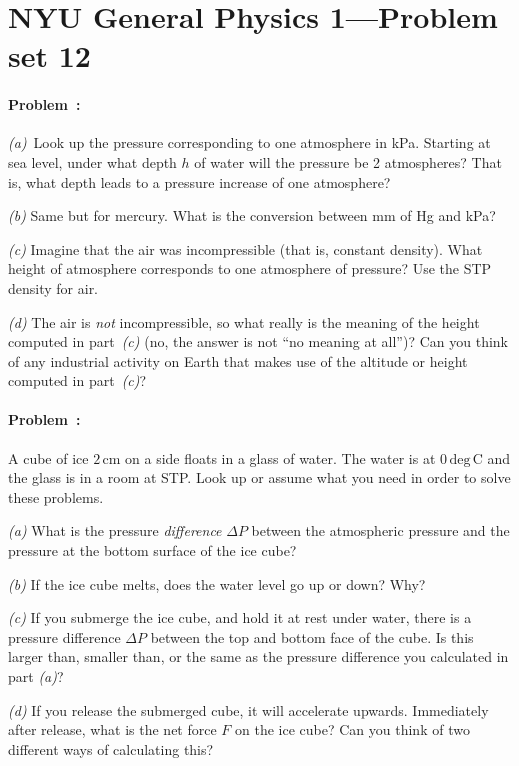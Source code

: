 \documentclass[12pt]{article}
\newcommand{\cm}{\mathrm{cm}}
\newcommand{\C}{\mathrm{deg\,C}}
\newcounter{problem}
\begin{document}
\thispagestyle{empty}

\section*{NYU General Physics 1---Problem set 12}

\paragraph{Problem~\theproblem:}%
\textsl{(a)}~Look up the pressure corresponding to one atmosphere in
kPa.  Starting at sea level, under what
depth $h$ of water will the pressure be 2 atmospheres?  That is, what
depth leads to a pressure increase of one atmosphere?

\textsl{(b)} Same but for mercury.  What is the conversion between mm
of Hg and kPa?

\textsl{(c)} Imagine that the air was incompressible (that is,
constant density).  What height of atmosphere corresponds to one
atmosphere of pressure?  Use the STP density for air.

\textsl{(d)} The air is \emph{not} incompressible, so what really is
the meaning of the height computed in part~\textsl{(c)} (no, the
answer is not ``no meaning at all'')?  Can you think of any industrial
activity on Earth that makes use of the altitude or height computed
in part~\textsl{(c)}?

\paragraph{Problem~\theproblem:}%
A cube of ice $2\,\cm$ on a side floats in a glass of water.  The
water is at $0\,\C$ and the glass is in a room at STP.  Look up or
assume what you need in order to solve these problems.

\textsl{(a)} What is the pressure \emph{difference} $\Delta P$ between
the atmospheric pressure and the pressure at the bottom surface of the
ice cube?

\textsl{(b)} If the ice cube melts, does the water level go up or
down?  Why?

\textsl{(c)} If you submerge the ice cube, and hold it at rest under
water, there is a pressure difference $\Delta P$ between the top and
bottom face of the cube.  Is this larger than, smaller than, or the
same as the pressure difference you calculated in part \textsl{(a)}?

\textsl{(d)} If you release the submerged cube, it will accelerate
upwards.  Immediately after release, what is the net force $F$ on the
ice cube?  Can you think of two different ways of calculating this?
\end{document}
